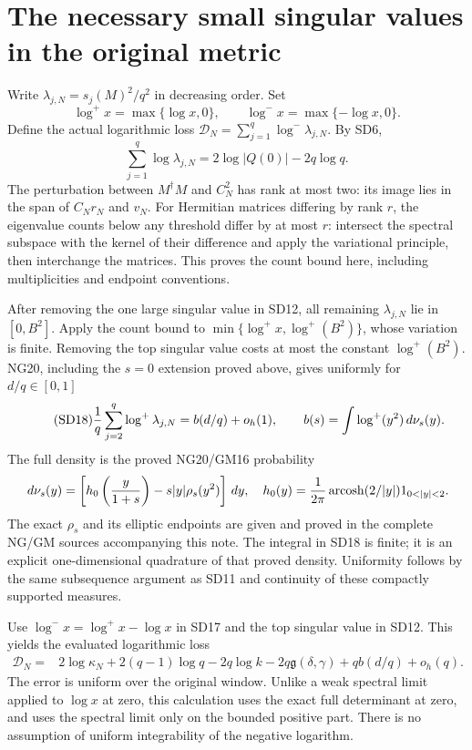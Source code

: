 \documentclass[11pt]{article}
\begin{document}
\section{The necessary small singular values in the original metric}
Write $\lambda_{j,N}=s_j(M)^2/q^2$ in decreasing order. Set
\[
\log^+x=\max\{\log x,0\},\qquad \log^-x=\max\{-\log x,0\}.
\]
Define the actual logarithmic loss
$\mathcal D_N=\sum_{j=1}^q\log^-\lambda_{j,N}$.
By SD6,
\begin{equation}\tag{SD17}
\sum_{j=1}^q\log\lambda_{j,N}=2\log|Q(0)|-2q\log q.
\end{equation}
The perturbation between $M^\dagger M$ and $C_N^2$ has rank at most
two: its image lies in the span of $C_Nr_N$ and $v_N$.
For Hermitian matrices differing by rank $r$, the eigenvalue counts
below any threshold differ by at most $r$: intersect the spectral
subspace with the kernel of their difference and apply the variational
principle, then interchange the matrices. This proves the count bound
here, including multiplicities and endpoint conventions.

After removing the one large singular value in SD12, all remaining
$\lambda_{j,N}$ lie in $[0,B^2]$. Apply the count bound to
$\min\{\log^+x,\log^+(B^2)\}$, whose variation is finite. Removing
the top singular value costs at most the constant $\log^+(B^2)$.
NG20, including the $s=0$
extension proved above, gives uniformly for $d/q\in[0,1]$
\begin{equation}\tag{SD18}
\frac1q\sum_{j=2}^q\log^+\lambda_{j,N}
=b(d/q)+o_h(1),\qquad
b(s)=\int\log^+(y^2)\,d\nu_s(y).
\end{equation}
The full density is the proved NG20/GM16 probability
\[
\osddd\nu_s(y)=\left[h_0\left(\frac y{1+s}\right)
-s|y|\rho_s(y^2)\right]\osddd y,\quad
h_0(y)=\frac1{2\pi}\operatorname{arcosh}(2/|y|)1_{0<|y|<2}.
\]
The exact $\rho_s$ and its elliptic endpoints are given and proved in
the complete NG/GM sources accompanying this note. The integral in
SD18 is finite; it is an explicit one-dimensional quadrature of that
proved density. Uniformity follows by the same subsequence argument
as SD11 and continuity of these compactly supported measures.

Use $\log^-x=\log^+x-\log x$ in SD17 and the top singular value in
SD12. This yields the evaluated logarithmic loss
\begin{equation}\tag{SD19}
\boxed{\begin{aligned}
\mathcal D_N={}&2\log\kappa_N+2(q-1)\log q-2q\log k
-2q\mathfrak g(\delta,\gamma)+qb(d/q)+o_h(q).
\end{aligned}}
\end{equation}
The error is uniform over the original window. Unlike a weak spectral
limit applied to $\log x$ at zero, this calculation uses the exact
full determinant at zero, and uses the spectral limit only on the
bounded positive part. There is no assumption of uniform integrability
of the negative logarithm.
\end{document}
